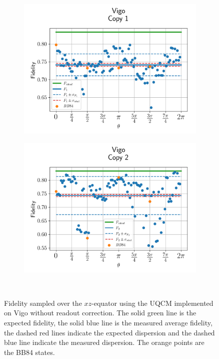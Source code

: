 \begin{figure}[H]
    \centering
    \begin{subfigure}{.45\textwidth}
      \centering
      \includegraphics[width=\textwidth]{Figures/UQCM/IBM/OnlyEquator/results_vigo_copy1.png}
    \end{subfigure}%
    \begin{subfigure}{.45\textwidth}
      \centering
      \includegraphics[width=\textwidth]{Figures/UQCM/IBM/OnlyEquator/results_vigo_copy2.png}
    \end{subfigure}
    \caption{Fidelity sampled over the $xz$-equator using the UQCM implemented on Vigo without readout correction. The solid green line is the expected fidelity, the solid blue line is the measured average fidelity, the dashed red lines indicate the expected dispersion and the dashed blue line indicate the measured dispersion. The orange points are the BB84 states.}
    \
\end{figure}


